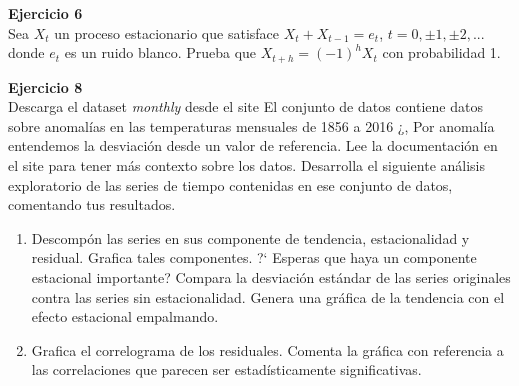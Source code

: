 \documentclass[a4paper, 11pt]{article}
\newenvironment{problem}[2][Ejercicio]
{ \begin{mdframed}[backgroundcolor= red!50] \textbf{#1 #2} \\}
	{  \end{mdframed}}
\begin{document}
\begin{problem}{6}
    Sea $X_t$ un proceso estacionario que satisface $X_t+ X_{t-1}= e_t$, $t= 0,\pm1, \pm2,...$ donde $e_t$ es un ruido blanco. Prueba que $X_{t+h} = (-1)^h X_t$ con probabilidad 1.
\end{problem}

\begin{problem}{8}
    Descarga el dataset \textit{monthly} desde el site 
    El conjunto de datos contiene datos sobre anomalías en las temperaturas mensuales de 1856 a 2016 ¿, Por anomalía entendemos la desviación desde un valor de referencia. Lee la documentación en el site para tener más contexto sobre los datos. Desarrolla el siguiente análisis exploratorio de las series de tiempo contenidas en ese conjunto de datos, comentando tus resultados.
    \begin{enumerate}
        \item Descompón las series en sus componente de tendencia, estacionalidad y residual. Grafica tales componentes. ?` Esperas que haya un componente estacional importante? Compara la desviación estándar de las series originales contra las series sin estacionalidad. Genera una gráfica de la tendencia con el efecto estacional empalmando.
        \item Grafica el correlograma de los residuales. Comenta la gráfica con referencia a las correlaciones que parecen ser estadísticamente significativas.
        
    \end{enumerate}
\end{problem}
\end{document}
